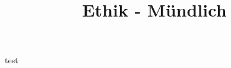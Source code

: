 \documentclass{article}
\title{Ethik - Mündlich}
\date{ }
\author{ }
\begin{document}
    \maketitle
    \tableofcontents

    \newpage

    
    test
\end{document}
